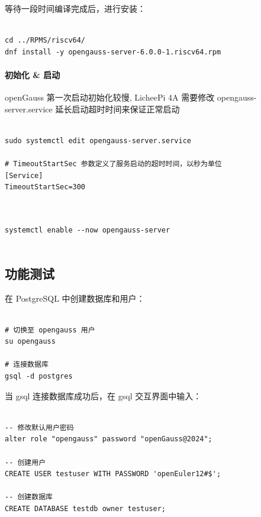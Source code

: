 \documentclass{article}
\begin{document}
等待一段时间编译完成后，进行安装：

\begin{verbatim}
  
cd ../RPMS/riscv64/
dnf install -y opengauss-server-6.0.0-1.riscv64.rpm

\end{verbatim}

\paragraph{初始化 \& 启动}

openGauss 第一次启动初始化较慢, LicheePi 4A 需要修改 opengauss-server.service 延长启动超时时间来保证正常启动

\begin{verbatim}

sudo systemctl edit opengauss-server.service

# TimeoutStartSec 参数定义了服务启动的超时时间，以秒为单位
[Service]
TimeoutStartSec=300
  
\end{verbatim}

\begin{verbatim}
  
systemctl enable --now opengauss-server
  
\end{verbatim}

\subsection{功能测试}

在 PostgreSQL 中创建数据库和用户：

\begin{verbatim}
  
# 切换至 opengauss 用户
su opengauss

# 连接数据库
gsql -d postgres

\end{verbatim}

当 gsql 连接数据库成功后，在 gsql 交互界面中输入：

\begin{verbatim}
  
-- 修改默认用户密码
alter role "opengauss" password "openGauss@2024";

-- 创建用户
CREATE USER testuser WITH PASSWORD 'openEuler12#$';

-- 创建数据库
CREATE DATABASE testdb owner testuser;

\end{verbatim}
\end{document}
